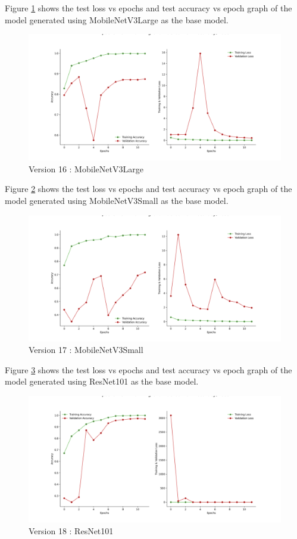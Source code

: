 Figure \ref{fig:mnetv3l} shows the test loss vs epochs and test accuracy vs epoch graph of the model generated using MobileNetV3Large as the base model.
\begin{figure}[H]
\includegraphics[scale=0.29]{Photos/MobileNetV3Large_plot.png}
\caption{Version 16 : MobileNetV3Large} \label{fig:mnetv3l}
\end{figure}
Figure \ref{fig:mnetv3s} shows the test loss vs epochs and test accuracy vs epoch graph of the model generated using MobileNetV3Small as the base model.
\begin{figure}[H]
\includegraphics[scale=0.29]{Photos/MobileNetV3Small_plot.png}
\caption{Version 17 : MobileNetV3Small} \label{fig:mnetv3s}
\end{figure}
Figure \ref{fig:resnet101} shows the test loss vs epochs and test accuracy vs epoch graph of the model generated using ResNet101 as the base model.
\begin{figure}[H]
\includegraphics[scale=0.29]{Photos/ResNet101_plot.png}
\caption{Version 18 : ResNet101} \label{fig:resnet101}
\end{figure}

